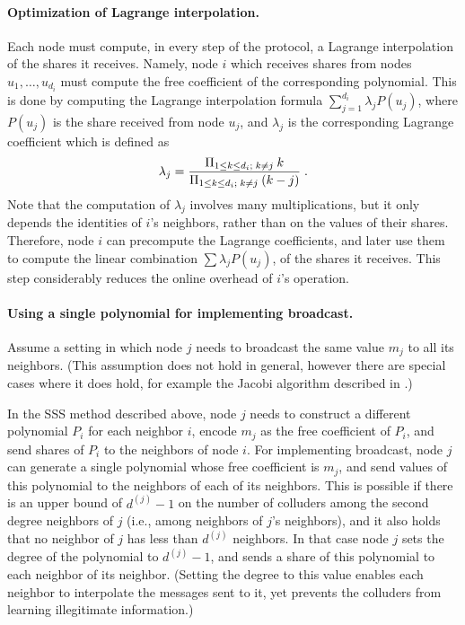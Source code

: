 \documentclass[10pt]{svjour3}
\begin{document}
\paragraph{Optimization of Lagrange interpolation.}
Each node must compute, in every step of the protocol, a Lagrange
interpolation of the shares it receives. Namely, node $i$ which
receives shares from nodes $u_1,\ldots,u_{d_i}$ must compute the free
coefficient of the corresponding polynomial. This is done by computing
the Lagrange interpolation formula $\sum_{j=1}^{d_i}\lambda_j P(u_j)$,
where $P(u_j)$ is the share received from node $u_j$, and $\lambda_j$
is the corresponding Lagrange coefficient which is defined as
$$\lambda_j = {
  \Pi_{1\leq k \leq d_i; \; k \neq j\; }k \over \Pi_{1\leq k \leq d_i;
    \; k \neq j\; }(k-j)}\;.$$ Note that the computation of
$\lambda_j$ involves many multiplications, but it only depends the
identities of $i$'s neighbors, rather than on the values of their
shares. Therefore, node $i$ can precompute the Lagrange coefficients,
and later use them to compute the linear combination $\sum\lambda_j
P(u_j)$, of the shares it receives. This step considerably reduces the
online overhead of $i$'s operation.

\paragraph{Using a single polynomial for implementing broadcast.}
Assume a setting in which node $j$ needs to broadcast the same value $m_j$
to all its neighbors. (This assumption does not hold in general, however
there are special cases where it does hold, for example the Jacobi algorithm described in .)

In the SSS method described above, node $j$ needs to construct a
different polynomial $P_i$ for each neighbor $i$, encode $m_j$ as the
free coefficient of $P_i$, and send shares of $P_i$ to the neighbors
of node $i$. For implementing broadcast, node $j$ can generate a single polynomial whose
free coefficient is $m_j$, and send values of this polynomial to the
neighbors of each of its neighbors. This is possible if there is an
upper bound of $d^{(j)}-1$ on the number of colluders among the second
degree neighbors of $j$ (i.e., among neighbors of $j$'s neighbors),
and it also holds that no neighbor of $j$ has less than $d^{(j)}$
neighbors. In that case node $j$ sets the degree of the polynomial to
$d^{(j)}-1$, and sends a share of this polynomial to each neighbor of its
neighbor. (Setting the degree to this value enables each neighbor to
interpolate the messages sent to it, yet prevents the colluders from
learning illegitimate information.)
\end{document}
